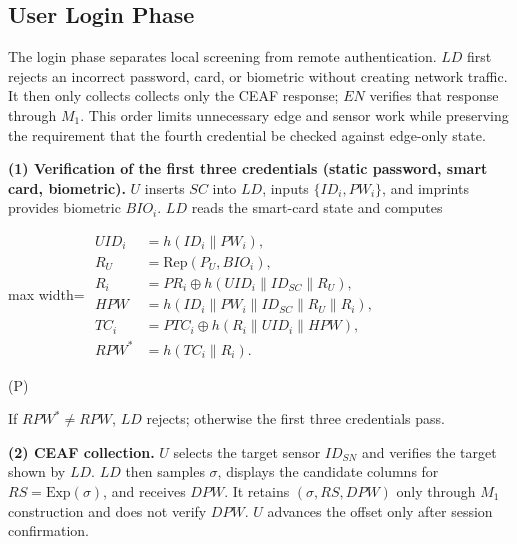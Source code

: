 \documentclass[cmc,article,submit,moreauthors,pdftex]{Definitions/tsp}
\renewcommand{\mathsf}[1]{\mathrm{#1}}
\newcommand{\cc}{\mathbin{\|}}
\newcommand{\Rep}{\mathrm{Rep}}
\newcounter{protoeq} %
\newenvironment{ceq}{%
  \refstepcounter{protoeq}%
  \par\vspace{-3pt}\setlength{\topsep}{0pt}\setlength{\partopsep}{0pt}\begin{center}%
}{%
  \hspace{0.45em}\textup{(P\theprotoeq)}%
  \end{center}\vspace{-3pt}%
} %
\providecommand{\DIFadd}[1]{{\protect\color{blue} \sf #1}} %
\providecommand{\DIFdel}[1]{{\protect\color{red} \scriptsize #1}} %
\providecommand{\DIFaddbegin}{} %
\providecommand{\DIFaddend}{} %
\providecommand{\DIFdelbegin}{} %
\providecommand{\DIFdelend}{} %
\begin{document}
\subsection{User Login Phase}\label{sec:login}

The login phase separates local screening from remote authentication. $LD$ first rejects an incorrect password, card, or biometric without creating network traffic. It then \DIFdelbegin \DIFdel{only collects }\DIFdelend \DIFaddbegin \DIFadd{collects only }\DIFaddend the CEAF response; $EN$ verifies that response through $M_1$. This order limits unnecessary edge and sensor work while preserving the requirement that the fourth credential be checked against edge-only state.

\textbf{(1) Verification of the first three credentials (static password, smart card, biometric).} $U$ inserts $SC$ into $LD$, inputs $\{ID_i, PW_i\}$, and \DIFdelbegin \DIFdel{imprints }\DIFdelend \DIFaddbegin \DIFadd{provides biometric }\DIFaddend $BIO_i$. $LD$ reads the smart-card state and computes

\DIFdelbegin %
\DIFdelend \DIFaddbegin \begin{ceq}
\DIFaddend \begin{adjustbox}{max width=\columnwidth}
$\displaystyle\begin{aligned}
UID_i &= h(ID_i \cc PW_i),\\
R_U &= \Rep(P_U, BIO_i),\\
R_i &= PR_i \oplus h(UID_i \cc ID_{SC} \cc R_U),\\
HPW &= h(ID_i \cc PW_i \cc ID_{SC} \cc R_U \cc R_i),\\
TC_i &= PTC_i \oplus h(R_i \cc UID_i \cc HPW),\\
RPW^{*} &= h(TC_i \cc R_i).
\end{aligned}$
\end{adjustbox}
\DIFdelbegin %
\DIFdelend \DIFaddbegin \end{ceq}
\DIFaddend 

If $RPW^{*}\neq RPW$, $LD$ rejects; otherwise the first three credentials pass.

\textbf{(2) CEAF collection.} $U$ selects the target sensor $ID_{SN}$ and verifies the target shown by $LD$. $LD$ then samples $\sigma$, displays the candidate columns for $RS=\mathsf{Exp}(\sigma)$, and receives $DPW$. It retains $(\sigma,RS,DPW)$ only through $M_1$ construction and does not verify $DPW$. $U$ advances the offset only after session confirmation.
\end{document}
